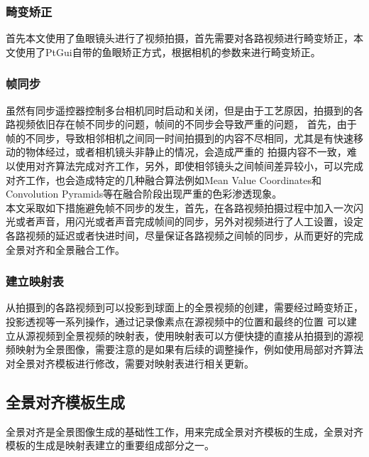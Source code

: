 \subsubsection{畸变矫正}
首先本文使用了鱼眼镜头进行了视频拍摄，首先需要对各路视频进行畸变矫正，本文使用了PtGui自带的鱼眼矫正方式，根据相机的参数来进行畸变矫正。
\subsubsection{帧同步}
虽然有同步遥控器控制多台相机同时启动和关闭，但是由于工艺原因，拍摄到的各路视频依旧存在帧不同步的问题，帧间的不同步会导致严重的问题，
首先，由于帧的不同步，导致相邻相机之间同一时间拍摄到的内容不尽相同，尤其是有快速移动的物体经过，或者相机镜头非静止的情况，会造成严重的
拍摄内容不一致，难以使用对齐算法完成对齐工作，另外，即使相邻镜头之间帧间差异较小，可以完成对齐工作，也会造成特定的几种融合算法例如Mean Value Coordinates和Convolution Pyramids等在融合阶段出现严重的色彩渗透现象。\\
\indent 本文采取如下措施避免帧不同步的发生，首先，在各路视频拍摄过程中加入一次闪光或者声音，用闪光或者声音完成帧间的同步，另外对视频进行了人工设置，设定各路视频的延迟或者快进时间，尽量保证各路视频之间帧的同步，从而更好的完成全景对齐和全景融合工作。
\subsubsection{建立映射表}
从拍摄到的各路视频到可以投影到球面上的全景视频的创建，需要经过畸变矫正，投影透视等一系列操作，通过记录像素点在源视频中的位置和最终的位置
可以建立从源视频到全景视频的映射表，使用映射表可以方便快捷的直接从拍摄到的源视频映射为全景图像，需要注意的是如果有后续的调整操作，例如使用局部对齐算法对全景对齐模板进行修改，需要对映射表进行相关更新。
\subsection{全景对齐模板生成}
全景对齐是全景图像生成的基础性工作，用来完成全景对齐模板的生成，全景对齐模板的生成是映射表建立的重要组成部分之一。
